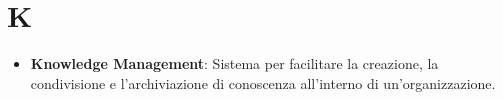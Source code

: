 \section*{K}  
\begin{itemize}
    \item \textbf{Knowledge Management}: Sistema per facilitare la creazione, la condivisione e l'archiviazione di conoscenza all'interno di un'organizzazione.
\end{itemize}
